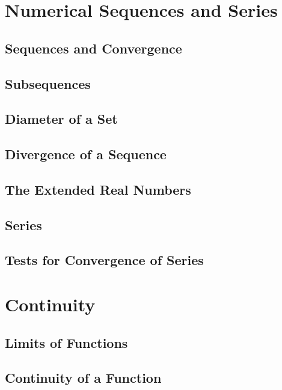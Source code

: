 \documentclass[a4paper, openany]{book}
\begin{document}
\chapter{Numerical Sequences and Series}
\section{Sequences and Convergence}

\newpage

\section{Subsequences}

\newpage

\section{Diameter of a Set}

\newpage

\section{Divergence of a Sequence}

\newpage

\section{The Extended Real Numbers}

\newpage

\section{Series}

\newpage

\section{Tests for Convergence of Series}

\newpage

\chapter{Continuity}
\section{Limits of Functions}

\newpage

\section{Continuity of a Function}

\newpage
\end{document}
